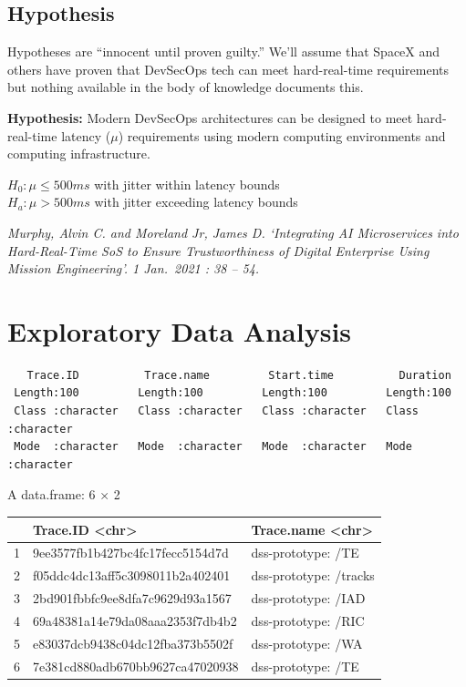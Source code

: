 \documentclass[
  letterpaper,
  DIV=11,
  numbers=noendperiod]{scrartcl}
\begin{document}
\hypertarget{hypothesis}{%
\subsection{Hypothesis}\label{hypothesis}}

Hypotheses are ``innocent until proven guilty.'' We'll assume that
SpaceX and others have proven that DevSecOps tech can meet
hard-real-time requirements but nothing available in the body of
knowledge documents this.

\textbf{Hypothesis:} Modern DevSecOps architectures can be designed to
meet hard-real-time latency (\(\mu\)) requirements using modern
computing environments and computing infrastructure.

\(H_0: \mu \le 500 ms\) with jitter within latency bounds\\
\(H_a: \mu > 500 ms\) with jitter exceeding latency bounds

\emph{Murphy, Alvin C. and Moreland Jr, James D. `Integrating AI
Microservices into Hard-Real-Time SoS to Ensure Trustworthiness of
Digital Enterprise Using Mission Engineering'. 1 Jan.~2021 : 38 -- 54.}

\hypertarget{exploratory-data-analysis}{%
\section{Exploratory Data Analysis}\label{exploratory-data-analysis}}

\begin{verbatim}
   Trace.ID          Trace.name         Start.time          Duration        
 Length:100         Length:100         Length:100         Length:100        
 Class :character   Class :character   Class :character   Class :character  
 Mode  :character   Mode  :character   Mode  :character   Mode  :character  
\end{verbatim}

A data.frame: 6 × 2

\begin{longtable}[]{@{}lll@{}}
\toprule()
& Trace.ID \textless chr\textgreater{} & Trace.name
\textless chr\textgreater{} \\
\midrule()
\endhead
1 & 9ee3577fb1b427bc4fc17fecc5154d7d & dss-prototype: /TE \\
2 & f05ddc4dc13aff5c3098011b2a402401 & dss-prototype: /tracks \\
3 & 2bd901fbbfc9ee8dfa7c9629d93a1567 & dss-prototype: /IAD \\
4 & 69a48381a14e79da08aaa2353f7db4b2 & dss-prototype: /RIC \\
5 & e83037dcb9438c04dc12fba373b5502f & dss-prototype: /WA \\
6 & 7e381cd880adb670bb9627ca47020938 & dss-prototype: /TE \\
\bottomrule()
\end{longtable}
\end{document}
